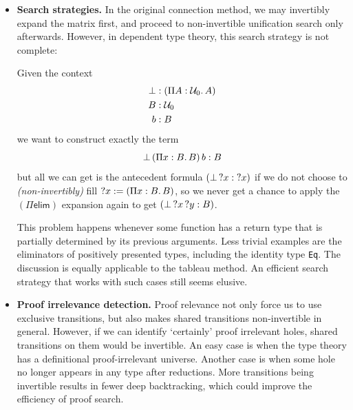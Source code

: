 \documentclass[twoside]{report}
\begin{document}
\begin{itemize}
    \item \textbf{Search strategies.} In the original connection method, we may invertibly expand the matrix first, and proceed to non-invertible unification search only afterwards. However, in dependent type theory, this search strategy is not complete:
          \begin{example}
              Given the context
              $$
                  \begin{aligned}
                      \bot & : (\Pi{A} : {\mathcal U_0}.\,{A}) \\
                      B    & : \mathcal U_0              \\
                      b    & : B                         \\
                  \end{aligned}
              $$
              we want to construct exactly the term
              $$
                  {{\bot}\,{(}\Pi{x} : {B}.\,{B})}\,{b} : B
              $$
              but all we can get is the antecedent formula $({\bot}\,{?x} : {?x})$ if we do not choose to \emph{(non-invertibly)} fill ${?x} := (\Pi{x} : {B}.\,{B})$, so we never get a chance to apply the $(\Pi\mathsf{elim})$ expansion again to get $({{\bot}\,{?x}}\,{?y} : B)$.
          \end{example}
          This problem happens whenever some function has a return type that is partially determined by its previous arguments. Less trivial examples are the eliminators of positively presented types, including the identity type \texttt{Eq}. The discussion is equally applicable to the tableau method. An efficient search strategy that works with such cases still seems elusive.

    \item \textbf{Proof irrelevance detection.} Proof relevance not only force us to use exclusive transitions, but also makes shared transitions non-invertible in general. However, if we can identify `certainly' proof irrelevant holes, shared transitions on them would be invertible. An easy case is when the type theory has a definitional proof-irrelevant universe. Another case is when some hole no longer appears in any type after reductions. More transitions being invertible results in fewer deep backtracking, which could improve the efficiency of proof search.
\end{itemize}
\end{document}
